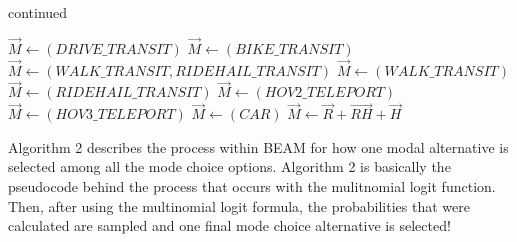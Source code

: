 \documentclass[fancy, masters]{byuthesis}
\begin{document}
\addtocounter{algorithm}{-1}
\begin{algorithm}
\caption{continued}
\begin{algorithmic} [1]
      \State $\vec{M} \gets (DRIVE\_TRANSIT)$
    \Else
      \State $\vec{M} \gets (BIKE\_TRANSIT)$
    \EndIf  
  \Else
    \State $\vec{M} \gets (WALK\_TRANSIT, RIDEHAIL\_TRANSIT)$
  \EndIf
{}  
    \State $\vec{M} \gets (WALK\_TRANSIT)$
  \Else
    \State $\vec{M} \gets (RIDEHAIL\_TRANSIT)$
  \EndIf
{}  
    \State $\vec{M} \gets (HOV2\_TELEPORT)$
  \Else
    \State $\vec{M} \gets (HOV3\_TELEPORT)$
  \EndIf
{}
  \State $\vec{M} \gets (CAR)$
\Else
  \State $\vec{M} \gets \vec{R} + \vec{RH} + \vec{H}$  
\EndIf  
\EndProcedure
\EndFor
\EndFor
\Statex
\end{algorithmic}
\end{algorithm}

Algorithm 2 describes the process within BEAM for how one modal alternative is selected among all the mode choice options. Algorithm 2 is basically the pseudocode behind the process that occurs with the mulitnomial logit function. Then, after using the multinomial logit formula, the probabilities that were calculated are sampled and one final mode choice alternative is selected!
\end{document}

